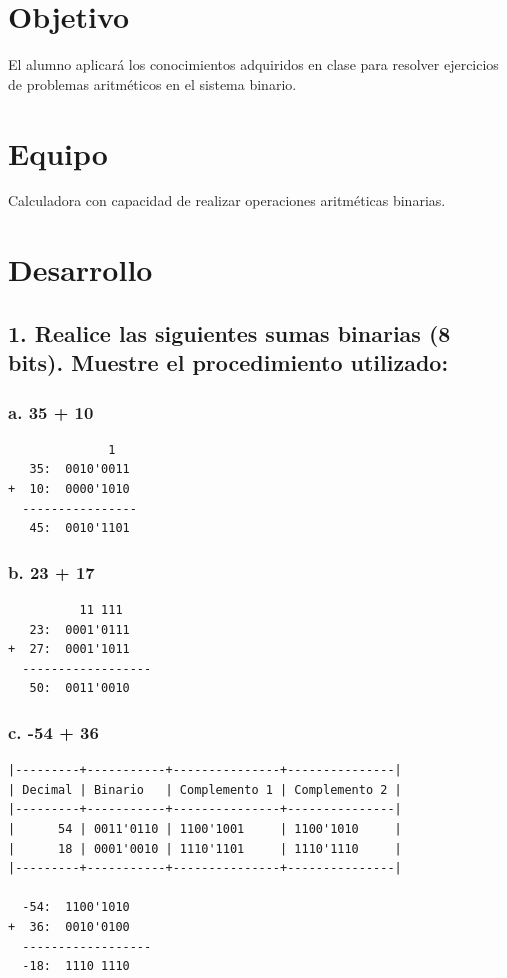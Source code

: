 \documentclass[12pt]{article}
\begin{document}
\section*{Objetivo}
\label{sec:org4afcd5b}
El alumno aplicará los conocimientos adquiridos en clase para resolver ejercicios de problemas aritméticos en el sistema binario.

\section*{Equipo}
\label{sec:org05d84d8}
Calculadora con capacidad de realizar operaciones aritméticas binarias.
\pagebreak

\section*{Desarrollo}
\label{sec:org908f269}
\subsection*{1. Realice las siguientes sumas binarias (8 bits). Muestre el procedimiento utilizado:}
\label{sec:orge383424}
\subsubsection*{a. 35 + 10}
\label{sec:org5637fd1}
\begin{verbatim}
              1
   35:  0010'0011
+  10:  0000'1010
  ----------------
   45:  0010'1101
\end{verbatim}

\subsubsection*{b. 23 + 17}
\label{sec:org9e3218b}
\begin{verbatim}
          11 111
   23:  0001'0111 
+  27:  0001'1011 
  ------------------
   50:  0011'0010
\end{verbatim}

\subsubsection*{c. -54 + 36}
\label{sec:org843ac33}
\begin{verbatim}
|---------+-----------+---------------+---------------|
| Decimal | Binario   | Complemento 1 | Complemento 2 |
|---------+-----------+---------------+---------------|
|      54 | 0011'0110 | 1100'1001     | 1100'1010     |
|      18 | 0001'0010 | 1110'1101     | 1110'1110     |
|---------+-----------+---------------+---------------| 

  -54:  1100'1010
+  36:  0010'0100
  ------------------
  -18:  1110 1110
\end{verbatim}
\end{document}
